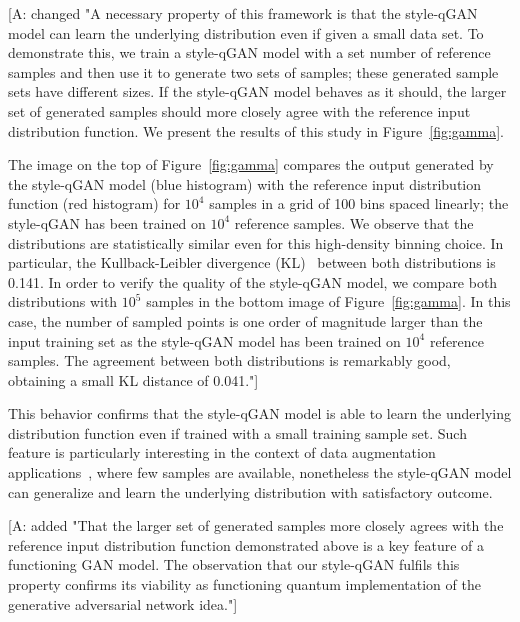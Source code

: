 \documentclass[twocolumn,preprintnumbers,superscriptaddress]{revtex4-2}
\newcommand{\commentAF}[1]{{\color{cyan} {[A: #1]}}}
\begin{document}
\commentAF{changed
"A necessary property of this framework is that the style-qGAN model can learn the underlying distribution even if given a small data set. To demonstrate this, we train a style-qGAN model with a set number of reference samples and then use it to generate two sets of samples; these generated sample sets have different sizes. If the style-qGAN model behaves as it should, the larger set of generated samples should more closely agree with the reference input distribution function. We present the results of this study in Figure~\ref{fig:gamma}.

The image on the top of Figure~\ref{fig:gamma} compares the output generated by
the style-qGAN model (blue histogram) with the reference input distribution
function (red histogram) for $10^4$ samples in a grid of 100 bins spaced
linearly; the style-qGAN has been trained on $10^4$ reference samples. We observe that the distributions are statistically similar even for
this high-density binning choice. In particular, the Kullback-Leibler
divergence (KL)~\cite{kullback1951information} between both distributions is
0.141.
%
In order to verify the quality of the style-qGAN model, we compare both distributions
with $10^5$ samples in the bottom image of Figure~\ref{fig:gamma}. In this case,
the number of sampled points is one order of magnitude larger than the input
training set as the style-qGAN model has been trained on $10^4$ reference samples. The agreement between both distributions is remarkably good,
obtaining a small KL distance of 0.041."}
%
This behavior confirms that the style-qGAN model is able to learn the underlying
distribution function even if trained with a small training sample set. Such
feature is particularly interesting in the context of data augmentation
applications~\cite{frid2018synthetic,tanaka2019data}, where few samples are
available, nonetheless the style-qGAN model can generalize and learn the underlying distribution
with satisfactory outcome.

\commentAF{ added "That the larger set of generated samples more closely agrees with the reference input distribution function demonstrated above is a key feature of a functioning GAN model. The observation that our style-qGAN fulfils this property confirms its viability as functioning quantum implementation of the generative adversarial network idea."}
\end{document}
